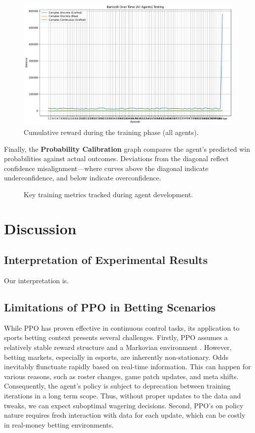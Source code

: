 \documentclass[sigconf]{acmart}
\begin{document}
\begin{figure}[t]
  \centering
  \includegraphics[width=\textwidth]{bankroll_all_testing.pdf}
  \caption{Cumulative reward during the training phase (all agents).}
  \label{fig:bankroll_all_testing}
\end{figure}

Finally, the \textbf{Probability Calibration} graph compares the agent's predicted win probabilities against actual outcomes. Deviations from the diagonal reflect confidence misalignment—where curves above the diagonal indicate underconfidence, and below indicate overconfidence.

\begin{figure}[ht]
  \centering
  \caption{Key training metrics tracked during agent development.}
  \label{fig:training_metrics}
\end{figure}


\section{Discussion}

\subsection{Interpretation of Experimental Results}

Our interpretation is.

\subsection{Limitations of PPO in Betting Scenarios}

While PPO has proven effective in continuous control tasks, its application to sports betting context presents several challenges. Firstly, PPO assumes a relatively stable reward structure and a Markovian environment \cite{schulman2017ppo}. However, betting markets, especially in esports, are inherently non-stationary. Odds inevitably flunctuate rapidly based on real-time information. This can happen for various reasons, such as roster changes, game patch updates, and meta shifts. Consequently, the agent's policy is subject to deprecation between training iterations in a long term scope. Thus, without proper updates to the data and tweaks, we can expect suboptimal wagering decisions. Second, PPO's on policy nature requires fresh interaction with data for each update, which can be costly in real-money betting environments.
\end{document}
